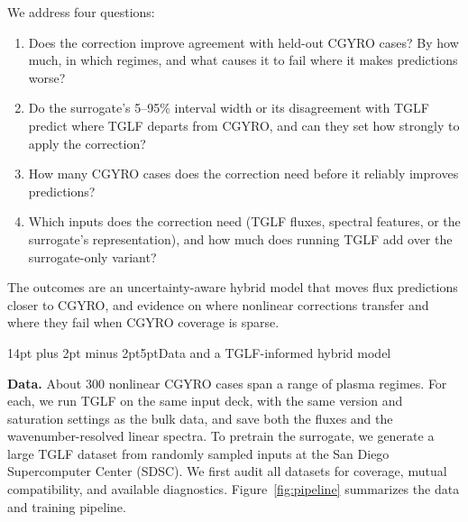 \documentclass[10pt,letterpaper]{article}
\makeatletter
\renewcommand{\section}{\@startsection{section}{1}{0pt}
 {14pt plus 2pt minus 2pt}{5pt}{\normalfont\large\bfseries}}
\makeatother
\begin{document}
We address four questions:
\begin{enumerate}
      \item Does the correction improve agreement with held-out CGYRO cases? By how much, in which regimes, and what causes it to fail where it makes predictions worse?
      \item Do the surrogate's 5--95\% interval width or its disagreement with TGLF predict where TGLF departs from CGYRO, and can they set how strongly to apply the correction?
      \item How many CGYRO cases does the correction need before it reliably improves predictions?
      \item Which inputs does the correction need (TGLF fluxes, spectral features, or the surrogate's representation), and how much does running TGLF add over the surrogate-only variant?
\end{enumerate}

The outcomes are an uncertainty-aware hybrid model that moves flux predictions closer to CGYRO, and evidence on where nonlinear corrections transfer and where they fail when CGYRO coverage is sparse.

\section{Data and a TGLF-informed hybrid model}

\textbf{Data.} About 300 nonlinear CGYRO cases span a range of plasma regimes. For each, we run TGLF on the same input deck, with the same version and saturation settings as the bulk data, and save both the fluxes and the wavenumber-resolved linear spectra. To pretrain the surrogate, we generate a large TGLF dataset from randomly sampled inputs at the San Diego Supercomputer Center (SDSC). We first audit all datasets for coverage, mutual compatibility, and available diagnostics. Figure~\ref{fig:pipeline} summarizes the data and training pipeline.
\end{document}
